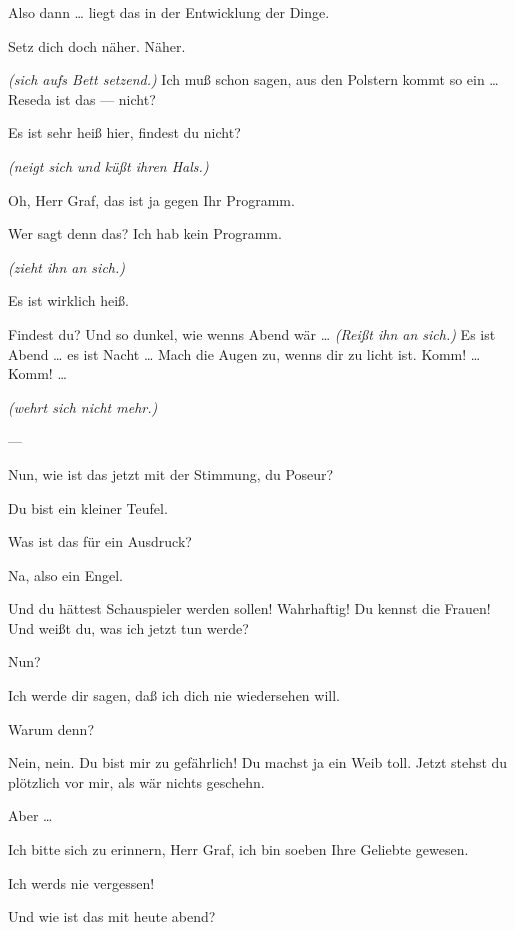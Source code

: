 \documentclass[
	final,
	a4paper,
	ngerman,
	mpinclude = true, %
	twoside = true,
	open = right,
	cleardoublepage = plain,
	DIV = 13,
	BCOR = 1cm,
	titlepage = firstiscover,
	]{scrbook}
\newcommand{\direction}[1]{\textit{(#1)}}
\newcommand{\hiat}{---}
\newcommand{\thecharacter}[1]{\textup{\textsc{#1}}}
\newcommand{\theschauspielerin}{\thecharacter{Schauspielerin}}
\newcommand{\thegraf}{\thecharacter{Graf}}
\newcommand{\character}[1]{\item[#1:]}
\newcommand{\schauspielerin}{\character{\theschauspielerin}}
\newcommand{\graf}{\character{\thegraf}}
\begin{document}
\begin{play}
	\graf
	Also dann \ldots{} liegt das in der Entwicklung der Dinge.

	\schauspielerin
	Setz dich doch näher. Näher.

	\graf
	\direction{sich aufs Bett setzend.} Ich muß schon sagen, aus den Polstern kommt so ein \ldots{} Reseda ist das --- nicht?

	\schauspielerin
	Es ist sehr heiß hier, findest du nicht?

	\graf
	\direction{neigt sich und küßt ihren Hals.}

	\schauspielerin
	Oh, Herr Graf, das ist ja gegen Ihr Programm.

	\graf
	Wer sagt denn das? Ich hab kein Programm.

	\schauspielerin
	\direction{zieht ihn an sich.}

	\graf
	Es ist wirklich heiß.

	\schauspielerin
	Findest du? Und so dunkel, wie wenns Abend wär \ldots{} \direction{Reißt ihn an sich.} Es ist Abend \ldots{} es ist Nacht \ldots{} Mach die Augen zu, wenns dir zu licht ist. Komm! \ldots{} Komm! \ldots{}

	\graf
	\direction{wehrt sich nicht mehr.}

	\hiat

	\schauspielerin
	Nun, wie ist das jetzt mit der Stimmung, du Poseur?

	\graf
	Du bist ein kleiner Teufel.

	\schauspielerin
	Was ist das für ein Ausdruck?

	\graf
	Na, also ein Engel.

	\schauspielerin
	Und du hättest Schauspieler werden sollen! Wahrhaftig! Du kennst die Frauen! Und weißt du, was ich jetzt tun werde?

	\graf
	Nun?

	\schauspielerin
	Ich werde dir sagen, daß ich dich nie wiedersehen will.

	\graf
	Warum denn?

	\schauspielerin
	Nein, nein. Du bist mir zu gefährlich! Du machst ja ein Weib toll. Jetzt stehst du plötzlich vor mir, als wär nichts geschehn.

	\graf
	Aber \ldots{}

	\schauspielerin
	Ich bitte sich zu erinnern, Herr Graf, ich bin soeben Ihre Geliebte gewesen.

	\graf
	Ich werds nie vergessen!

	\schauspielerin
	Und wie ist das mit heute abend?


\end{play}
\end{document}
